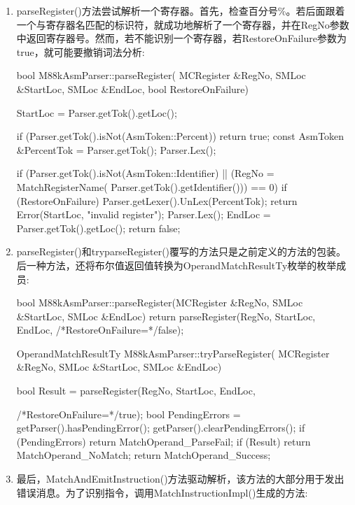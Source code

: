 \begin{enumerate}
\item
parseRegister()方法尝试解析一个寄存器。首先，检查百分号\%。若后面跟着一个与寄存器名匹配的标识符，就成功地解析了一个寄存器，并在RegNo参数中返回寄存器号。然而，若不能识别一个寄存器，若RestoreOnFailure参数为true，就可能要撤销词法分析:

\begin{cpp}
bool M88kAsmParser::parseRegister(
        MCRegister &RegNo, SMLoc &StartLoc, SMLoc &EndLoc,
        bool RestoreOnFailure) {
    StartLoc = Parser.getTok().getLoc();

    if (Parser.getTok().isNot(AsmToken::Percent))
        return true;
    const AsmToken &PercentTok = Parser.getTok();
    Parser.Lex();

    if (Parser.getTok().isNot(AsmToken::Identifier) ||
        (RegNo = MatchRegisterName(
            Parser.getTok().getIdentifier())) == 0) {
        if (RestoreOnFailure)
            Parser.getLexer().UnLex(PercentTok);
        return Error(StartLoc, "invalid register");
    }
    Parser.Lex();
    EndLoc = Parser.getTok().getLoc();
    return false;
}
\end{cpp}

\item
parseRegister()和tryparseRegister()覆写的方法只是之前定义的方法的包装。后一种方法，还将布尔值返回值转换为OperandMatchResultTy枚举的枚举成员:

\begin{cpp}
bool M88kAsmParser::parseRegister(MCRegister &RegNo,
                                    SMLoc &StartLoc,
                                    SMLoc &EndLoc) {
    return parseRegister(RegNo, StartLoc, EndLoc,
                         /*RestoreOnFailure=*/false);
}

OperandMatchResultTy M88kAsmParser::tryParseRegister(
        MCRegister &RegNo, SMLoc &StartLoc, SMLoc &EndLoc) {
    bool Result =
        parseRegister(RegNo, StartLoc, EndLoc,

    /*RestoreOnFailure=*/true);
    bool PendingErrors = getParser().hasPendingError();
    getParser().clearPendingErrors();
    if (PendingErrors)
        return MatchOperand_ParseFail;
    if (Result)
        return MatchOperand_NoMatch;
    return MatchOperand_Success;
}
\end{cpp}

\item
最后，MatchAndEmitInstruction()方法驱动解析，该方法的大部分用于发出错误消息。为了识别指令，调用MatchInstructionImpl()生成的方法:


\end{enumerate}
